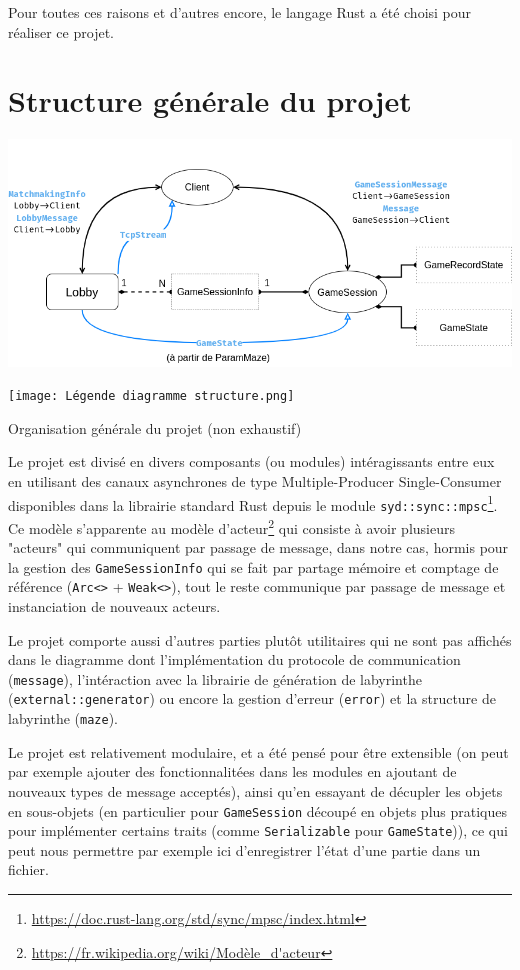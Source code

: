 \documentclass{EPUProjetDi}
\begin{document}
Pour toutes ces raisons et d'autres encore, le langage Rust a été choisi pour réaliser ce projet.

\chapter{Structure générale du projet}

\begin{center}
  \includegraphics[width=\linewidth]{Diagramme structure.png}
  \label{fig:DiagrammeStructure}
  
  \texttt{[image: Légende diagramme structure.png]}

  Organisation générale du projet (non exhaustif)
\end{center}

Le projet est divisé en divers composants (ou modules) intéragissants entre eux en utilisant des canaux asynchrones de type Multiple-Producer Single-Consumer disponibles dans la librairie standard Rust depuis le module \verb|syd::sync::mpsc|\footnote{\url{https://doc.rust-lang.org/std/sync/mpsc/index.html}}. Ce modèle s'apparente au modèle d'acteur\footnote{\url{https://fr.wikipedia.org/wiki/Modèle_d'acteur}} qui consiste à avoir plusieurs "acteurs" qui communiquent par passage de message, dans notre cas, hormis pour la gestion des \verb|GameSessionInfo| qui se fait par partage mémoire et comptage de référence (\verb|Arc<>| + \verb|Weak<>|), tout le reste communique par passage de message et instanciation de nouveaux acteurs.

Le projet comporte aussi d'autres parties plutôt utilitaires qui ne sont pas affichés dans le diagramme dont l'implémentation du protocole de communication (\verb|message|), l'intéraction avec la librairie de génération de labyrinthe (\verb|external::generator|) ou encore la gestion d'erreur (\verb|error|) et la structure de labyrinthe (\verb|maze|).

Le projet est relativement modulaire, et a été pensé pour être extensible (on peut par exemple ajouter des fonctionnalitées dans les modules en ajoutant de nouveaux types de message acceptés), ainsi qu'en essayant de décupler les objets en sous-objets (en particulier pour \verb|GameSession| découpé en objets plus pratiques pour implémenter certains traits (comme \verb|Serializable| pour \verb|GameState|)), ce qui peut nous permettre par exemple ici d'enregistrer l'état d'une partie dans un fichier.
\end{document}
